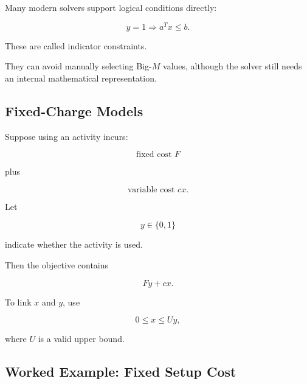 Many modern solvers support logical conditions directly:

\[
\boxed{
y=1
\Rightarrow
a^Tx\leq b.
}
\]

These are called indicator constraints.

They can avoid manually selecting Big-\(M\) values, although the solver
still needs an internal mathematical representation.

\subsection{Fixed-Charge Models}
\label{subsec:fixed-charge-models}

Suppose using an activity incurs:

\[
\boxed{
\text{fixed cost }F
}
\]

plus

\[
\boxed{
\text{variable cost }cx.
}
\]

Let

\[
y\in\{0,1\}
\]

indicate whether the activity is used.

Then the objective contains

\[
\boxed{
Fy+cx.
}
\]

To link \(x\) and \(y\), use

\[
\boxed{
0\leq x\leq Uy,
}
\]

where \(U\) is a valid upper bound.

\subsection{Worked Example: Fixed Setup Cost}
\label{subsec:worked-fixed-charge}

